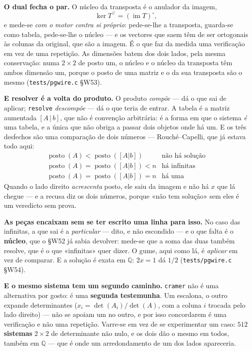 \documentclass[11pt,a4paper]{article}
\newcommand{\code}[1]{\texttt{\small #1}}
\begin{document}
\medskip\noindent\textbf{O dual fecha o par.} O núcleo da transposta é o
anulador da imagem,
\[
\ker T^{\!\top}=(\operatorname{im}T)^{\circ},
\]
e mede-se \emph{com o motor contra si próprio}: pede-se-lhe a transposta,
guarda-se como tabela, pede-se-lhe o núcleo --- e os vectores que saem têm de
ser ortogonais às colunas da original, que são a imagem. É o que faz da medida
uma verificação em vez de uma repetição. As dimensões batem dos dois lados, pela
mesma conservação: numa $2\times2$ de posto um, o núcleo e o núcleo da
transposta têm ambos dimensão um, porque o posto de uma matriz e o da sua
transposta são o mesmo (\code{tests/pgwire.c} §W53).

\medskip\noindent\textbf{E resolver é a volta do produto.} O produto
\emph{compõe} --- dá o que sai de aplicar; \code{resolve} \emph{descompõe} ---
dá o que teria de entrar. A tabela é a matriz aumentada $[A\,|\,b]$, que não é
convenção arbitrária: é a forma em que o sistema \emph{é} uma tabela, e a única
que não obriga a passar dois objetos onde há um. E os três desfechos são uma
comparação de dois números --- Rouché--Capelli, que já estava todo aqui:
\[
\begin{array}{ll}
\operatorname{posto}(A)<\operatorname{posto}([A|b]) & \text{não há solução}\\
\operatorname{posto}(A)=\operatorname{posto}([A|b])<n & \text{há infinitas}\\
\operatorname{posto}(A)=\operatorname{posto}([A|b])=n & \text{há uma}
\end{array}
\]
Quando o lado direito \emph{acrescenta} posto, ele saiu da imagem e não há $x$
que lá chegue --- e a recusa diz os dois números, porque «não tem solução» sem
eles é um veredicto sem prova.

\medskip\noindent\textbf{As peças encaixam sem se ter escrito uma linha para
isso.} No caso das infinitas, a que sai é a \emph{particular} --- dito, e não
escondido --- e o que falta é o \textbf{núcleo}, que o §W52 já sabia devolver:
mede-se que a soma das duas também resolve, que é o que «infinitas» quer dizer.
O gume, aqui como lá, é \emph{aplicar} em vez de comparar. E a solução é exata
em $\mathbb{Q}$: $2x=1$ dá $1/2$ (\code{tests/pgwire.c} §W54).

\medskip\noindent\textbf{E o mesmo sistema tem um segundo caminho.}
\code{cramer} não é uma alternativa por gosto: é uma \textbf{segunda
testemunha}. Um escalona, o outro expande determinantes
($x_i=\det(A_i)/\det(A)$, com a coluna $i$ trocada pelo lado direito) --- não se
apoiam um no outro, e por isso concordarem é uma verificação e não uma
repetição. Varre-se em vez de se experimentar um caso: \textbf{$512$ sistemas}
$2\times2$ de determinante não nulo, e os dois dão o mesmo em todos, também
em $\mathbb{Q}$ --- que é onde um arredondamento de um dos lados apareceria.
\end{document}
